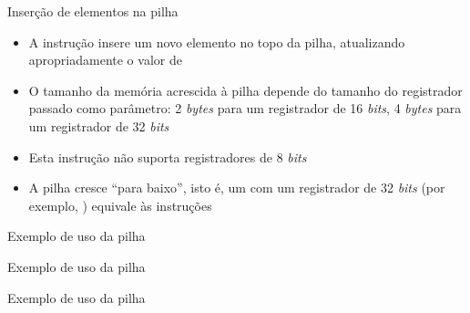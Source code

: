 \begin{frame}[fragile]{Inserção de elementos na pilha}

    \begin{itemize}
        \item A instrução  insere um novo elemento no topo da pilha, atualizando
            apropriadamente o valor de 


        \item O tamanho da memória acrescida à pilha depende do tamanho do registrador passado
            como parâmetro: 2 \textit{bytes} para um registrador de 16 \textit{bits}, 4 
            \textit{bytes} para um registrador de 32 \textit{bits}

        \item Esta instrução não suporta registradores de 8 \textit{bits}

        \item A pilha cresce ``para baixo'', isto é, um  com um registrador de
            32 \textit{bits} (por exemplo, ) equivale às instruções


    \end{itemize}

\end{frame}



\begin{frame}[fragile]{Exemplo de uso da pilha}
\end{frame}

\begin{frame}[fragile]{Exemplo de uso da pilha}
\end{frame}

\begin{frame}[fragile]{Exemplo de uso da pilha}
\end{frame}
